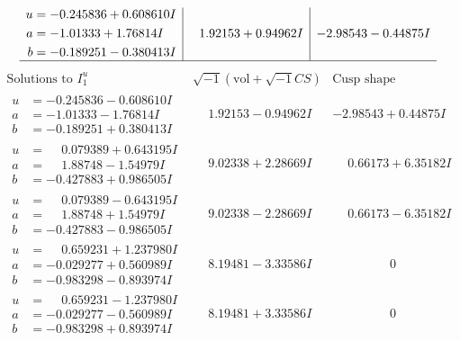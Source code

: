 \documentclass[1p]{elsarticle_modified}
\theoremstyle{definition}
\newcommand{\I}{\sqrt{-1}}
\begin{document}
$$\begin{array}{c|c|c}
\begin{aligned}
u &= -0.245836 + 0.608610 I \\
a &= -1.01333 + 1.76814 I \\
b &= -0.189251 - 0.380413 I\end{aligned}
 & \phantom{-}1.92153 + 0.94962 I & -2.98543 - 0.44875 I\\
 \hline 
 \end{array}$$\newpage$$\begin{array}{c|c|c}  
\text{Solutions to }I^u_{1}& \I (\text{vol} + \sqrt{-1}CS) & \text{Cusp shape}\\
 \hline 
\begin{aligned}
u &= -0.245836 - 0.608610 I \\
a &= -1.01333 - 1.76814 I \\
b &= -0.189251 + 0.380413 I\end{aligned}
 & \phantom{-}1.92153 - 0.94962 I & -2.98543 + 0.44875 I \\ \hline\begin{aligned}
u &= \phantom{-}0.079389 + 0.643195 I \\
a &= \phantom{-}1.88748 - 1.54979 I \\
b &= -0.427883 + 0.986505 I\end{aligned}
 & \phantom{-}9.02338 + 2.28669 I & \phantom{-}0.66173 + 6.35182 I \\ \hline\begin{aligned}
u &= \phantom{-}0.079389 - 0.643195 I \\
a &= \phantom{-}1.88748 + 1.54979 I \\
b &= -0.427883 - 0.986505 I\end{aligned}
 & \phantom{-}9.02338 - 2.28669 I & \phantom{-}0.66173 - 6.35182 I \\ \hline\begin{aligned}
u &= \phantom{-}0.659231 + 1.237980 I \\
a &= -0.029277 + 0.560989 I \\
b &= -0.983298 - 0.893974 I\end{aligned}
 & \phantom{-}8.19481 - 3.33586 I & \phantom{-0.000000 } 0 \\ \hline\begin{aligned}
u &= \phantom{-}0.659231 - 1.237980 I \\
a &= -0.029277 - 0.560989 I \\
b &= -0.983298 + 0.893974 I\end{aligned}
 & \phantom{-}8.19481 + 3.33586 I & \phantom{-0.000000 } 0 \\ \hline\begin{aligned}

\end{aligned}
\end{array}$$
\end{document}
